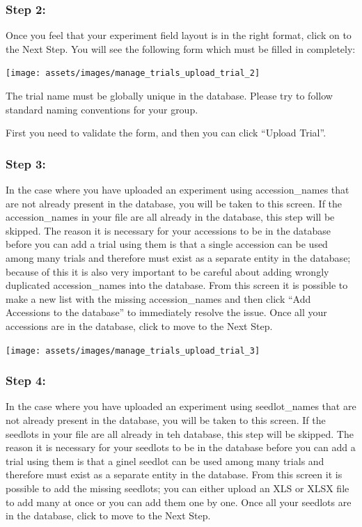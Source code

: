 \documentclass[
  12pt,
]{book}
\begin{document}
\hypertarget{step-2}{%
\subsubsection*{Step 2:}\label{step-2}}


Once you feel that your experiment field layout is in the right format, click on to the Next Step. You will see the following form which must be filled in completely:

\begin{center}\texttt{[image: assets/images/manage\_trials\_upload\_trial\_2]} \end{center}

The trial name must be globally unique in the database. Please try to follow standard naming conventions for your group.

First you need to validate the form, and then you can click ``Upload Trial''.

\hypertarget{step-3}{%
\subsubsection*{Step 3:}\label{step-3}}


In the case where you have uploaded an experiment using accession\_names that are not already present in the database, you will be taken to this screen. If the accession\_names in your file are all already in the database, this step will be skipped. The reason it is necessary for your accessions to be in the database before you can add a trial using them is that a single accession can be used among many trials and therefore must exist as a separate entity in the database; because of this it is also very important to be careful about adding wrongly duplicated accession\_names into the database. From this screen it is possible to make a new list with the missing accession\_names and then click ``Add Accessions to the database'' to immediately resolve the issue. Once all your accessions are in the database, click to move to the Next Step.

\begin{center}\texttt{[image: assets/images/manage\_trials\_upload\_trial\_3]} \end{center}

\hypertarget{step-4}{%
\subsubsection*{Step 4:}\label{step-4}}


In the case where you have uploaded an experiment using seedlot\_names that are not already present in the database, you will be taken to this screen. If the seedlots in your file are all already in teh database, this step will be skipped. The reason it is necessary for your seedlots to be in the database before you can add a trial using them is that a ginel seedlot can be used among many trials and therefore must exist as a separate entity in the database. From this screen it is possible to add the missing seedlots; you can either upload an XLS or XLSX file to add many at once or you can add them one by one. Once all your seedlots are in the database, click to move to the Next Step.
\end{document}
